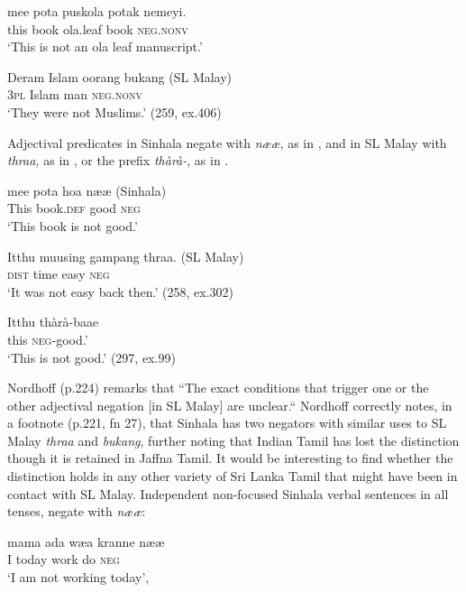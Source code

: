 \ea\label{ex3.10.1} 
\gll mee pota puskola potak nemeyi.\\
 this book ola.leaf book \textsc{neg.nonv} \\
 `This is not an ola leaf manuscript.'
\z




\ea\label{ex3.10.2} 
\gll Deram Islam oorang bukang (SL Malay)\\
 3\textsc{pl} Islam man \textsc{neg.nonv}\\
 `They were not Muslims.' (259, ex.406)
\z


 Adjectival predicates in Sinhala negate with \textit{n{\ae}{\ae}}, as in , and in SL Malay with \textit{thraa,} as in , or the prefix  \textit{thàrà-}, as in . 


\ea\label{ex3.10.3} 
\gll mee  pota  ho{\und}a n{\ae}{\ae} (Sinhala)\\
 This book.\textsc{def}  good  \textsc{neg} \\
 `This book is not good.' 
\z



\ea\label{ex3.10.4} 
\gll Itthu muusing gampang thraa. (SL Malay)\\
 \textsc{dist} time easy \textsc{neg}\\
 `It was not easy back then.' (258, ex.302)
\z




\ea\label{ex3.10.5} 
\gll Itthu thàrà-baae\\
 this \textsc{neg}-good.' \\
 `This is not good.'  (297, ex.99)
\z


 Nordhoff (p.224) remarks that ``The exact conditions that trigger one or the other adjectival negation [in SL Malay] are unclear.``
 Nordhoff correctly notes, in a footnote (p.221, fn 27), that Sinhala has two negators with similar uses to SL Malay \textit{thraa} and \textit{bukang}, further noting that Indian Tamil has lost the distinction though it is retained in Jaffna Tamil. It would be interesting to find whether the distinction holds in any other variety of Sri Lanka Tamil that might have been in contact with SL Malay.
Independent non-focused Sinhala verbal sentences in all tenses, negate with \textit{n{\ae}{\ae}}: 
 

\ea\label{ex3.10.6}
\gll mama ada w{\ae}{\dotd}a k{\E}ranne n{\ae}{\ae}\\
  I today work do \textsc{neg} \\
  `I am not working today',
\z


